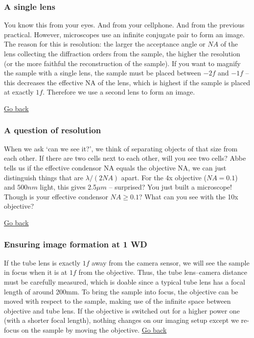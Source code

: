 \documentclass[a4paper]{report}
\begin{document}
\subsubsection{A single lens}
You know this from your eyes. And from your cellphone. And from the previous practical. However, microscopes use an infinite conjugate pair to form an image. The reason for this is resolution: the larger the acceptance angle or $NA$ of the lens collecting the diffraction orders from the sample, the higher the resolution (or the more faithful the reconstruction of the sample). If you want to magnify the sample with a single lens, the sample must be placed between $-2f$ and $-1f$ -- this decreases the effective NA of the lens, which is highest if the sample is placed at exactly $1f$. Therefore we use a second lens to form an image.

   \noindent
   \hyperlink{hintBack-imaging}{Go back}

\subsubsection{A question of resolution}
When we ask `can we see it?', we think of separating objects of that size from each other. If there are two cells next to each other, will you see two cells?
Abbe tells us if the effective condensor NA equals the objective NA, we can just distinguish things that are $\lambda / (2NA)$ apart.
For the 4x objective ($NA=0.1$) and $500nm$ light, this gives 2.5$\mu m$ -- surprised?
You just built a microscope! Though is your effective condensor $NA\geq 0.1$?
What can you see with the 10x objective?

   \noindent
   \hyperlink{hintBack-imaging}{Go back}

\subsubsection{Ensuring image formation at 1 WD}
If the tube lens is exactly $1f$ away from the camera sensor, we will see the sample in focus when it is at $1f$ from the objective.
Thus, the tube lens--camera distance must be carefully measured, which is doable since a typical tube lens has a focal length of around 200mm.
To bring the sample into focus, the objective can be moved with respect to the sample, making use of the infinite space between objective and tube lens.
If the objective is switched out for a higher power one (with a shorter focal length), nothing changes on our imaging setup except we re-focus on the sample by moving the objective.
\noindent
\hyperlink{hintBack-imaging}{Go back}
\clearpage
\end{document}
